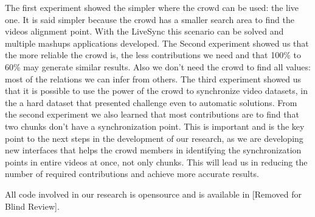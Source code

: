 \documentclass[sigconf]{acmart}
\begin{document}
The first experiment showed the simpler where the crowd can be used: the live one. It is said simpler because the crowd has a smaller search area to find the videos alignment point. With the LiveSync this scenario can be solved and multiple mashups applications developed. The Second experiment showed us that the more reliable the crowd is, the less contributions we need and that 100\% to 60\% may generate similar results. Also we don't need the crowd to find all values: most of the relations we can infer from others. The third experiment showed us that it is possible to use the power of the crowd to synchronize video datasets, in the a hard dataset that presented challenge even to automatic solutions. From the second experiment we also learned that most contributions are to find that two chunks don't have a synchronization point. This is important and is the key point to the next steps in the development of our research, as we are developing new interfaces that helps the crowd members in identifying the synchronization points in entire videos at once, not only chunks. This will lead us in reducing the number of required contributions and achieve more accurate results.

All code involved in our research is opensource and is available in [Removed for Blind Review].




 
\end{document}
